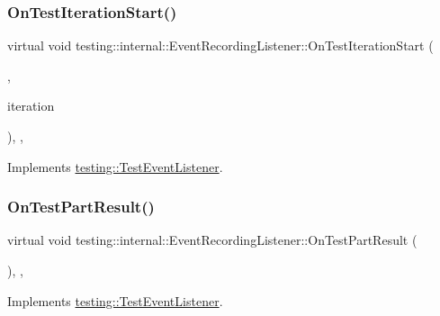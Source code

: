 \subsubsection{\texorpdfstring{OnTestIterationStart()}{OnTestIterationStart()}}
{\footnotesize\ttfamily virtual void testing\+::internal\+::\+Event\+Recording\+Listener\+::\+On\+Test\+Iteration\+Start (\begin{DoxyParamCaption}\item[{const \mbox{\hyperlink{classtesting_1_1UnitTest}{Unit\+Test}} \&}]{,  }\item[{int}]{iteration }\end{DoxyParamCaption})\hspace{0.3cm}{\ttfamily [inline]}, {\ttfamily [protected]}, {\ttfamily [virtual]}}



Implements \mbox{\hyperlink{classtesting_1_1TestEventListener_a60cc09b7907cb329d152eb5e7133bdeb}{testing\+::\+Test\+Event\+Listener}}.

\mbox{\label{classtesting_1_1internal_1_1EventRecordingListener_a4a6685d894923f1691ad9c6a4311470e}} 
\subsubsection{\texorpdfstring{OnTestPartResult()}{OnTestPartResult()}}
{\footnotesize\ttfamily virtual void testing\+::internal\+::\+Event\+Recording\+Listener\+::\+On\+Test\+Part\+Result (\begin{DoxyParamCaption}\item[{const Test\+Part\+Result \&}]{ }\end{DoxyParamCaption})\hspace{0.3cm}{\ttfamily [inline]}, {\ttfamily [protected]}, {\ttfamily [virtual]}}



Implements \mbox{\hyperlink{classtesting_1_1TestEventListener_a054f8705c883fa120b91473aff38f2ee}{testing\+::\+Test\+Event\+Listener}}.

\mbox{\label{classtesting_1_1internal_1_1EventRecordingListener_a21fe9c3c519c4599a48b16ddfb734aa3}} 
